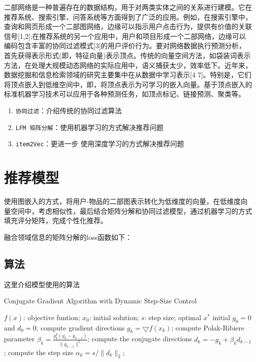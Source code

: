 \documentclass[lang=cn,11pt]{elegantpaper}
\begin{document}
二部网络是一种普遍存在的数据结构，用于对两类实体之间的关系进行建模。它在推荐系统、搜索引擎、问答系统等方面得到了广泛的应用。例如，在搜索引擎中，查询和网页形成一个二部图网络，边缘可以指示用户点击行为，提供有价值的关联信号[1,2];在推荐系统的另一个应用中，用户和项目形成一个二部网络，边缘可以编码包含丰富的协同过滤模式[3]的用户评价行为。要对网络数据执行预测分析，首先获得表示形式(即，特征向量)表示顶点。传统的向量空间方法，如袋装词表示方法，在处理大规模动态网络的实际应用中，语义捕获太少，效率低下。近年来，数据挖掘和信息检索领域的研究主要集中在从数据中学习表示[4 7]。特别是，它们将顶点嵌入到低维空间中，即，将顶点表示为可学习的嵌入向量。基于顶点嵌入的标准机器学习技术可以应用于各种预测任务，如顶点标记、链接预测、聚类等。

\begin{enumerate}
	\item \lstinline{协同过滤}：介绍传统的协同过滤算法
	\item \lstinline{LFM 矩阵分解}：使用机器学习的方式解决推荐问题
	\item \lstinline{item2Vec}：更进一步 使用深度学习的方式解决推荐问题
\end{enumerate}


\section{推荐模型}
使用图嵌入的方式，将用户-物品的二部图表示转化为低维度的向量，在低维度向量空间中，考虑相似性，最后结合矩阵分解和协同过滤模型，通过机器学习的方式填充评分矩阵，完成个性化推荐。

融合领域信息的矩阵分解的loss函数如下：


\subsection{算法}

这里介绍模型使用的算法

\begin{algorithm}[h]  
	\caption{Conjugate Gradient Algorithm with Dynamic Step-Size Control}  
	\label{alg::conjugateGradient}  
	\begin{algorithmic}[1]  
		\Require  
		$f(x)$: objective funtion;  
		$x_0$: initial solution;  
		$s$: step size;  
		\Ensure  
		optimal $x^{*}$  
		\State initial $g_0=0$ and $d_0=0$;  
		\Repeat  
		\State compute gradient directions $g_k=\bigtriangledown f(x_k)$;  
		\State compute Polak-Ribiere parameter $\beta_k=\frac{g_k^{T}(g_k-g_{k-1})}{\parallel g_{k-1} \parallel^{2}}$;  
		\State compute the conjugate directions $d_k=-g_k+\beta_k d_{k-1}$;  
		\State compute the step size $\alpha_k=s/\parallel d_k \parallel_{2}$;  
	\end{algorithmic}  
\end{algorithm}  
\end{document}
